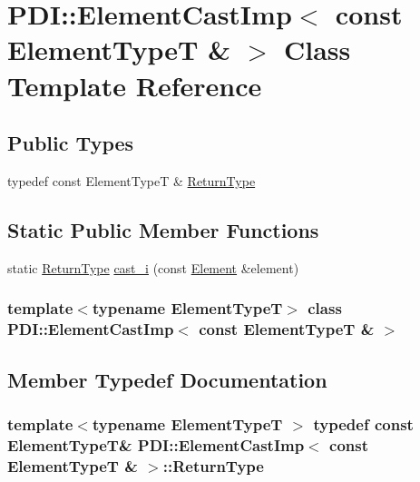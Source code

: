 \hypertarget{class_p_d_i_1_1_element_cast_imp_3_01const_01_element_type_t_01_6_01_4}{
\section{PDI::ElementCastImp$<$ const ElementTypeT \& $>$ Class Template Reference}
\label{class_p_d_i_1_1_element_cast_imp_3_01const_01_element_type_t_01_6_01_4}
}
\subsection*{Public Types}
\begin{CompactItemize}
\item 
typedef const ElementTypeT \& \hyperlink{class_p_d_i_1_1_element_cast_imp_3_01const_01_element_type_t_01_6_01_4_d8ec5822a837a3b6e60fb48472745e5b}{ReturnType}
\end{CompactItemize}
\subsection*{Static Public Member Functions}
\begin{CompactItemize}
\item 
static \hyperlink{class_p_d_i_1_1_element_cast_imp_3_01const_01_element_type_t_01_6_01_4_d8ec5822a837a3b6e60fb48472745e5b}{ReturnType} \hyperlink{class_p_d_i_1_1_element_cast_imp_3_01const_01_element_type_t_01_6_01_4_f98f6a39c5f6b3f1d49030db55e57427}{cast\_\-i} (const \hyperlink{class_p_d_i_1_1_element}{Element} \&element)
\end{CompactItemize}
\subsubsection*{template$<$typename ElementTypeT$>$ class PDI::ElementCastImp$<$ const ElementTypeT \& $>$}



\subsection{Member Typedef Documentation}
\hypertarget{class_p_d_i_1_1_element_cast_imp_3_01const_01_element_type_t_01_6_01_4_d8ec5822a837a3b6e60fb48472745e5b}{
\subsubsection[{ReturnType}]{\setlength{\rightskip}{0pt plus 5cm}template$<$typename ElementTypeT $>$ typedef const ElementTypeT\& PDI::ElementCastImp$<$ const ElementTypeT \& $>$::{\bf ReturnType}}}
\label{class_p_d_i_1_1_element_cast_imp_3_01const_01_element_type_t_01_6_01_4_d8ec5822a837a3b6e60fb48472745e5b}





